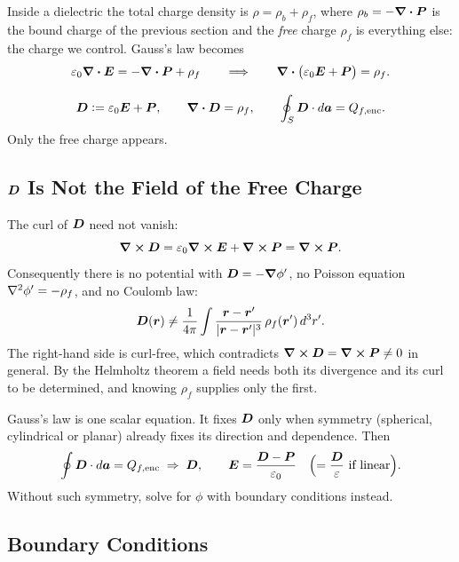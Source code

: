 Inside a dielectric the total charge density is $\rho = \rho_b + \rho_f$, where $\rho_b = -\div\vect{P}$ is the bound charge of the previous section and the \emph{free} charge $\rho_f$ is everything else: the charge we control. Gauss's law becomes
\[
    \varepsilon_0\div\vect{E} = -\div\vect{P} + \rho_f
    \qquad\Longrightarrow\qquad
    \div\bigl(\varepsilon_0\vect{E} + \vect{P}\bigr) = \rho_f .
\]

\begin{definition}
\[
    \vect{D} \defeq \varepsilon_0\vect{E} + \vect{P},
    \qquad
    \div\vect{D} = \rho_f,
    \qquad
    \oint_S\vect{D}\cdot d\lvect{a} = Q_{f,\text{enc}} .
\]
Only the free charge appears.
\end{definition}

\subsection{\texorpdfstring{$\vect{D}$}{D} Is Not the Field of the Free Charge}

The curl of $\vect{D}$ need not vanish:
\[
    \curl\vect{D} = \varepsilon_0\curl\vect{E} + \curl\vect{P} = \curl\vect{P}.
\]
Consequently there is no potential with $\vect{D} = -\grad\phi'$, no Poisson equation $\laplacian\phi' = -\rho_f$, and no Coulomb law:
\[
    \vect{D}(\lvect{r}) \neq \frac{1}{4\pi}\int\frac{\lvect{r}-\lvect{r}'}{|\lvect{r}-\lvect{r}'|^3}\,\rho_f(\lvect{r}')\,d^3r' .
\]
The right-hand side is curl-free, which contradicts $\curl\vect{D} = \curl\vect{P}\neq0$ in general. By the Helmholtz theorem a field needs both its divergence and its curl to be determined, and knowing $\rho_f$ supplies only the first.

\begin{fact}
Gauss's law is one scalar equation. It fixes $\vect{D}$ only when symmetry (spherical, cylindrical or planar) already fixes its direction and dependence. Then
\[
    \oint\vect{D}\cdot d\lvect{a} = Q_{f,\text{enc}}\;\Rightarrow\;\vect{D},
    \qquad
    \vect{E} = \frac{\vect{D}-\vect{P}}{\varepsilon_0}\quad\Bigl(=\frac{\vect{D}}{\varepsilon}\ \text{if linear}\Bigr).
\]
Without such symmetry, solve for $\phi$ with boundary conditions instead.
\end{fact}

\subsection{Boundary Conditions}


